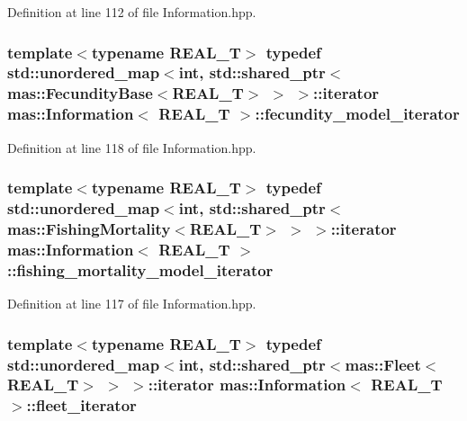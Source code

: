 Definition at line 112 of file Information.\-hpp.

\hypertarget{classmas_1_1_information_a1d4b59c5d61de9efed4709ce6e0a056a}{
\subsubsection[{fecundity\-\_\-model\-\_\-iterator}]{\setlength{\rightskip}{0pt plus 5cm}template$<$typename R\-E\-A\-L\-\_\-\-T$>$ typedef std\-::unordered\-\_\-map$<$int, std\-::shared\-\_\-ptr$<${\bf mas\-::\-Fecundity\-Base}$<$R\-E\-A\-L\-\_\-\-T$>$ $>$ $>$\-::iterator {\bf mas\-::\-Information}$<$ R\-E\-A\-L\-\_\-\-T $>$\-::{\bf fecundity\-\_\-model\-\_\-iterator}}}\label{classmas_1_1_information_a1d4b59c5d61de9efed4709ce6e0a056a}


Definition at line 118 of file Information.\-hpp.

\hypertarget{classmas_1_1_information_a4410f0f10156666ee305f22698943955}{
\subsubsection[{fishing\-\_\-mortality\-\_\-model\-\_\-iterator}]{\setlength{\rightskip}{0pt plus 5cm}template$<$typename R\-E\-A\-L\-\_\-\-T$>$ typedef std\-::unordered\-\_\-map$<$int, std\-::shared\-\_\-ptr$<${\bf mas\-::\-Fishing\-Mortality}$<$R\-E\-A\-L\-\_\-\-T$>$ $>$ $>$\-::iterator {\bf mas\-::\-Information}$<$ R\-E\-A\-L\-\_\-\-T $>$\-::{\bf fishing\-\_\-mortality\-\_\-model\-\_\-iterator}}}\label{classmas_1_1_information_a4410f0f10156666ee305f22698943955}


Definition at line 117 of file Information.\-hpp.

\hypertarget{classmas_1_1_information_a35add34ab4432f87d932531b06444ff7}{
\subsubsection[{fleet\-\_\-iterator}]{\setlength{\rightskip}{0pt plus 5cm}template$<$typename R\-E\-A\-L\-\_\-\-T$>$ typedef std\-::unordered\-\_\-map$<$int, std\-::shared\-\_\-ptr$<${\bf mas\-::\-Fleet}$<$R\-E\-A\-L\-\_\-\-T$>$ $>$ $>$\-::iterator {\bf mas\-::\-Information}$<$ R\-E\-A\-L\-\_\-\-T $>$\-::{\bf fleet\-\_\-iterator}}}\label{classmas_1_1_information_a35add34ab4432f87d932531b06444ff7}


